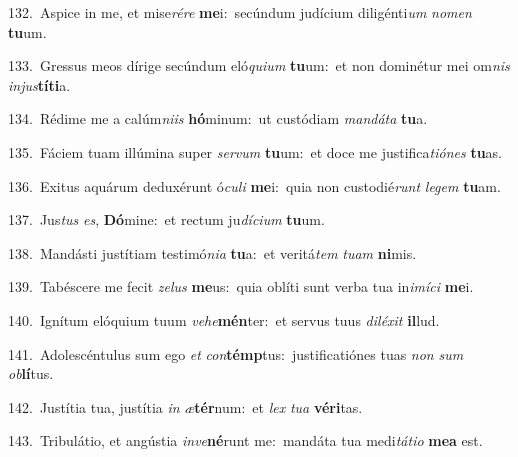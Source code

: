 {\numbfont\textcolor{\numbcolor}{132.}}~Aspice in me, et mise\-\textit{ré}\-\textit{re} \textbf{me}\-i:~\star secúndum judícium diligénti\textit{um} \textit{no}\-\textit{men} \textbf{tu}\-um.\par
{\numbfont\textcolor{\numbcolor}{133.}}~Gressus meos dírige secúndum eló\-\textit{qui}\-\textit{um} \textbf{tu}\-um:~\star et non dominétur mei om\textit{nis} \textit{in}\-\textit{jus}\textbf{tí}\textbf{ti}a.\par
{\numbfont\textcolor{\numbcolor}{134.}}~Rédime me a calúm\-\textit{ni}\-\textit{is} \textbf{hó}\-minum:~\star ut custódiam \textit{man}\-\textit{dá}\textit{ta} \textbf{tu}\-a.\par
{\numbfont\textcolor{\numbcolor}{135.}}~Fáciem tuam illúmina super \textit{ser}\-\textit{vum} \textbf{tu}\-um:~\star et doce me justifica\-\textit{ti}\-\textit{ó}\textit{nes} \textbf{tu}\-as.\par
{\numbfont\textcolor{\numbcolor}{136.}}~Exitus aquárum deduxérunt ó\-\textit{cu}\-\textit{li} \textbf{me}\-i:~\star quia non custodié\textit{runt} \textit{le}\-\textit{gem} \textbf{tu}\-am.\par
{\numbfont\textcolor{\numbcolor}{137.}}~Jus\textit{tus} \textit{es}\-, \textbf{Dó}\-mine:~\star et rectum ju\-\textit{dí}\-\textit{ci}\textit{um} \textbf{tu}\-um.\par
{\numbfont\textcolor{\numbcolor}{138.}}~Mandásti justítiam testimó\-\textit{ni}\-\textit{a} \textbf{tu}\-a:~\star et veritá\textit{tem} \textit{tu}\-\textit{am} \textbf{ni}\-mis.\par
{\numbfont\textcolor{\numbcolor}{139.}}~Tabéscere me fecit \textit{ze}\-\textit{lus} \textbf{me}\-us:~\star quia oblíti sunt verba tua in\-\textit{i}\-\textit{mí}\textit{ci} \textbf{me}\-i.\par
{\numbfont\textcolor{\numbcolor}{140.}}~Ignítum elóquium tuum \textit{ve}\-\textit{he}\textbf{mén}ter:~\star et servus tuus \textit{di}\-\textit{lé}\textit{xit} \textbf{il}\-lud.\par
{\numbfont\textcolor{\numbcolor}{141.}}~Adolescéntulus sum ego \textit{et} \textit{con}\-\textbf{témp}tus:~\star justificatiónes tuas \textit{non} \textit{sum} \textit{ob}\-\textbf{lí}tus.\par
{\numbfont\textcolor{\numbcolor}{142.}}~Justítia tua, justítia \textit{in} \textit{æ}\-\textbf{tér}num:~\star et \textit{lex} \textit{tu}\-\textit{a} \textbf{vé}\-\textbf{ri}tas.\par
{\numbfont\textcolor{\numbcolor}{143.}}~Tribulátio, et angústia \textit{in}\-\textit{ve}\textbf{né}runt me:~\star mandáta tua medi\-\textit{tá}\-\textit{ti}\textit{o} \textbf{me}\-\textbf{a} est.\par

